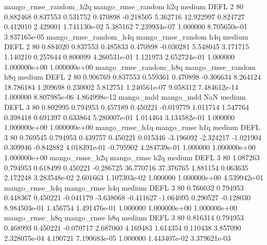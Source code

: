 mango_rmse_random_h2q mango_rmse_random                  h2q     medium     DEFL                 2 80  0.882468       0.837553 0.531752       0.470898   -0.218505      5.362716     12.922997     0.824727       0.412010  2.429001 1.741130e-02     5.385162   7.239934e-07            1.000000    8.705650e-01        3.837165e-05
mango_rmse_random_h4q mango_rmse_random                  h4q     medium     DEFL                 2 80  0.884020       0.837553 0.485833       0.470898   -0.030281      5.548045      3.171715     1.140210       0.257644  0.800099 4.260531e-01     1.121973   2.652724e-01            1.000000    1.000000e+00        1.000000e+00
mango_rmse_random_h8q mango_rmse_random                  h8q     medium     DEFL                 2 80  0.906769       0.837553 0.559361       0.470898   -0.306634      8.264124     18.786184     1.209698       0.230002  5.812751 1.240561e-07     9.058312   7.484612e-14            1.000000    8.807985e-06        4.864998e-12
            mango_mdd         mango_mdd                  NaN     medium     DEFL                 3 80  0.802995       0.794953 0.457189       0.450221   -0.019779      1.011714      1.547764     0.398418       0.691397  0.633864 5.280007e-01     1.014464   3.134582e-01            1.000000    1.000000e+00        1.000000e+00
       mango_rmse_h1q        mango_rmse                  h1q     medium     DEFL                 3 80  0.769545       0.794953 0.439757       0.450221    0.015346     -3.196092     -2.324217    -1.021904       0.309946 -0.842882 4.018391e-01    -0.795902   4.284739e-01            1.000000    1.000000e+00        1.000000e+00
       mango_rmse_h2q        mango_rmse                  h2q     medium     DEFL                 3 80  1.087263       0.794953 0.618499       0.450221   -0.286725     36.770716     37.376765     1.881154       0.063635  2.172248 3.283548e-02     2.601663   1.107303e-02            1.000000    1.000000e+00        4.539942e-01
       mango_rmse_h4q        mango_rmse                  h4q     medium     DEFL                 3 80  0.766032       0.794953 0.448367       0.450221   -0.041179     -3.638068     -0.411627    -1.064095       0.290527 -0.128030 8.984503e-01     1.456754   1.491476e-01            1.000000    1.000000e+00        1.000000e+00
       mango_rmse_h8q        mango_rmse                  h8q     medium     DEFL                 3 80  0.816314       0.794953 0.468993       0.450221   -0.070717      2.687060      4.169483     1.614354       0.110438  3.857090 2.328075e-04     4.190721   7.190683e-05            1.000000    1.443407e-02        3.379621e-03
